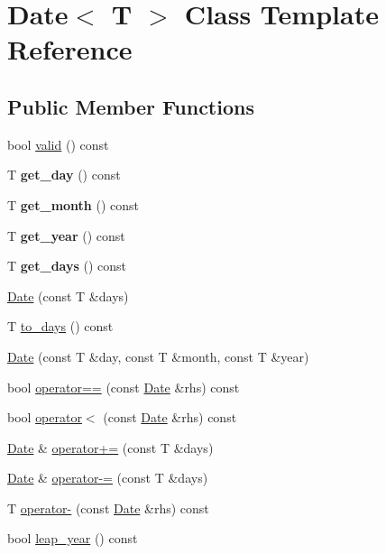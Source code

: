 \hypertarget{classDate}{
\section{Date$<$ T $>$ Class Template Reference}
\label{classDate}
}
\subsection*{Public Member Functions}
\begin{DoxyCompactItemize}
\item 
bool \hyperlink{classDate_abbb19de27d20c0e91798ebc77636acc1}{valid} () const 
\item 
\hypertarget{classDate_af7350744af66bd8e7ec9bf3f62934566}{
T {\bfseries get\_\-day} () const }
\label{classDate_af7350744af66bd8e7ec9bf3f62934566}

\item 
\hypertarget{classDate_af00b0ff782e14258699368e3e05c52ca}{
T {\bfseries get\_\-month} () const }
\label{classDate_af00b0ff782e14258699368e3e05c52ca}

\item 
\hypertarget{classDate_a5b3005aa2c19f33314261432d7f3d92a}{
T {\bfseries get\_\-year} () const }
\label{classDate_a5b3005aa2c19f33314261432d7f3d92a}

\item 
\hypertarget{classDate_a10864c03dcbc30d504fa33611a196e70}{
T {\bfseries get\_\-days} () const }
\label{classDate_a10864c03dcbc30d504fa33611a196e70}

\item 
\hyperlink{classDate_af957af1d1b2138d065fda5b555987fb8}{Date} (const T \&days)
\item 
T \hyperlink{classDate_a64620fd3e81930d15c7f9bc48ed4b92e}{to\_\-days} () const 
\item 
\hyperlink{classDate_a5531478f62a49470143266081c4fe83b}{Date} (const T \&day, const T \&month, const T \&year)
\item 
bool \hyperlink{classDate_a008a69648c7fa5998d2c5e712b73e6f3}{operator==} (const \hyperlink{classDate}{Date} \&rhs) const 
\item 
bool \hyperlink{classDate_ac633cf922af2965d5f22a229c0a51390}{operator$<$} (const \hyperlink{classDate}{Date} \&rhs) const 
\item 
\hyperlink{classDate}{Date} \& \hyperlink{classDate_a661f00c4979307ad8de12df28f4dccac}{operator+=} (const T \&days)
\item 
\hyperlink{classDate}{Date} \& \hyperlink{classDate_ad1b53baf96121981070652e0fd1aaaa4}{operator-\/=} (const T \&days)
\item 
T \hyperlink{classDate_a3691ee1370123a8ba506785bf2573433}{operator-\/} (const \hyperlink{classDate}{Date} \&rhs) const 
\item 
bool \hyperlink{classDate_ab69ff6d65cfc5e1c27fe6fed6e913236}{leap\_\-year} () const 
\end{DoxyCompactItemize}
